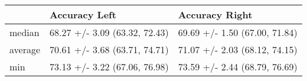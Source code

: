 \begin{tabular}{lll}
\toprule
{} &                  Accuracy Left &                 Accuracy Right \\
\midrule
median  &  68.27 +/- 3.09 (63.32, 72.43) &  69.69 +/- 1.50 (67.00, 71.84) \\
average &  70.61 +/- 3.68 (63.71, 74.71) &  71.07 +/- 2.03 (68.12, 74.15) \\
min     &  73.13 +/- 3.22 (67.06, 76.98) &  73.59 +/- 2.44 (68.79, 76.69) \\
\bottomrule
\end{tabular}
